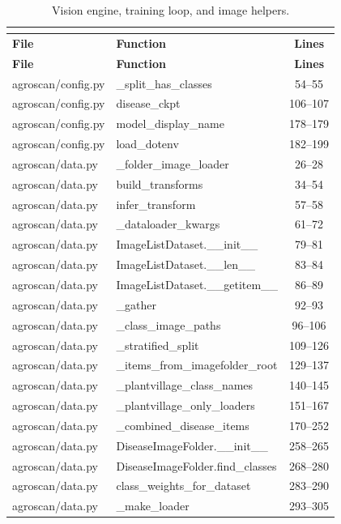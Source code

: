 \begin{center}
\footnotesize
\begin{longtable}{@{}p{4.6cm}p{5.2cm}c@{}}
\caption{Vision engine, training loop, and image helpers.}\\
\label{tab:pyvis}\\
\toprule
\textbf{File} & \textbf{Function} & \textbf{Lines} \\
\midrule
\endfirsthead
\toprule
\textbf{File} & \textbf{Function} & \textbf{Lines} \\
\midrule
\endhead
agroscan/config.py & \_split\_has\_classes & 54--55 \\
agroscan/config.py & disease\_ckpt & 106--107 \\
agroscan/config.py & model\_display\_name & 178--179 \\
agroscan/config.py & load\_dotenv & 182--199 \\
agroscan/data.py & \_folder\_image\_loader & 26--28 \\
agroscan/data.py & build\_transforms & 34--54 \\
agroscan/data.py & infer\_transform & 57--58 \\
agroscan/data.py & \_dataloader\_kwargs & 61--72 \\
agroscan/data.py & ImageListDataset.\_\_init\_\_ & 79--81 \\
agroscan/data.py & ImageListDataset.\_\_len\_\_ & 83--84 \\
agroscan/data.py & ImageListDataset.\_\_getitem\_\_ & 86--89 \\
agroscan/data.py & \_gather & 92--93 \\
agroscan/data.py & \_class\_image\_paths & 96--106 \\
agroscan/data.py & \_stratified\_split & 109--126 \\
agroscan/data.py & \_items\_from\_imagefolder\_root & 129--137 \\
agroscan/data.py & \_plantvillage\_class\_names & 140--145 \\
agroscan/data.py & \_plantvillage\_only\_loaders & 151--167 \\
agroscan/data.py & \_combined\_disease\_items & 170--252 \\
agroscan/data.py & DiseaseImageFolder.\_\_init\_\_ & 258--265 \\
agroscan/data.py & DiseaseImageFolder.find\_classes & 268--280 \\
agroscan/data.py & class\_weights\_for\_dataset & 283--290 \\
agroscan/data.py & \_make\_loader & 293--305 \\

\end{longtable}
\end{center}

